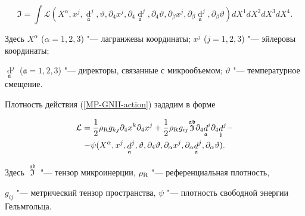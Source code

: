 \begin{equation}

\label{MP-GNII-action}


\Im  = \int{{\mathcal L}(X^\alpha,x^j,{\mathop d\limits_{\mathfrak a}}^j,\vartheta,\partial_4 x^j,\partial_4{\mathop d\limits_{\mathfrak a}}^j,\partial_4\vartheta,\partial_\beta x^j,\partial_\beta{\mathop d\limits_{\mathfrak a}}^j,\partial_\beta\vartheta) dX^1dX^2dX^3dX^4}.%



\end{equation}

Здесь $X^\alpha$ ($\alpha=1, 2, 3$) "--- лагранжевы координаты; $x^j$ ($j=1, 2, 3$) "--- эйлеровы координаты;

${\mathop d\limits_{\mathfrak a}}^j$ (${\mathfrak a}=1, 2, 3$) "--- директоры, связанные с микрообъемом; $\vartheta$ "--- температурное смещение.



Плотность действия (\ref{MP-GNII-action}) зададим в форме

\begin{multline}

\label{MP-GNII-Lagrangian}


{\mathcal L}=

\frac{1}{2}\rho_{\rm R}g_{kj}\partial_4 x^k\partial_4 x^j+

\frac{1}{2}\rho_{\rm R}g_{ij}{\mathop {\mathfrak I}\limits^{\mathfrak a\mathfrak b}}\partial_4{\mathop d\limits_{\mathfrak a}}^i\partial_4{\mathop d\limits_{\mathfrak b}}^j-\\

-\psi(X^\alpha,x^j,{\mathop d\limits_{\mathfrak a}}^j,\vartheta,\partial_4\vartheta,\partial_\alpha x^j,\partial_\alpha{\mathop d\limits_{\mathfrak a}}^j,\partial_\alpha\vartheta).


\end{multline}

Здесь ${\mathop {\mathfrak I}\limits^{\mathfrak a\mathfrak b}}$ "--- тензор микроинерции, $\rho_{\rm R}$ "--- референциальная плотность,

$g_{ij}$ "--- метрический тензор пространства, $\psi$ "--- плотность свободной энергии Гельмгольца.



